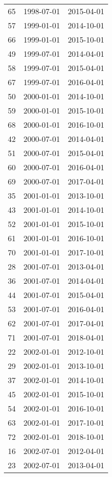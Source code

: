 % 
\begin{tabular}{ccc}
  \hline
  \hline
65 & 1998-07-01 & 2015-04-01 \\ 
  57 & 1999-01-01 & 2014-10-01 \\ 
  66 & 1999-01-01 & 2015-10-01 \\ 
  49 & 1999-07-01 & 2014-04-01 \\ 
  58 & 1999-07-01 & 2015-04-01 \\ 
  67 & 1999-07-01 & 2016-04-01 \\ 
  50 & 2000-01-01 & 2014-10-01 \\ 
  59 & 2000-01-01 & 2015-10-01 \\ 
  68 & 2000-01-01 & 2016-10-01 \\ 
  42 & 2000-07-01 & 2014-04-01 \\ 
  51 & 2000-07-01 & 2015-04-01 \\ 
  60 & 2000-07-01 & 2016-04-01 \\ 
  69 & 2000-07-01 & 2017-04-01 \\ 
  35 & 2001-01-01 & 2013-10-01 \\ 
  43 & 2001-01-01 & 2014-10-01 \\ 
  52 & 2001-01-01 & 2015-10-01 \\ 
  61 & 2001-01-01 & 2016-10-01 \\ 
  70 & 2001-01-01 & 2017-10-01 \\ 
  28 & 2001-07-01 & 2013-04-01 \\ 
  36 & 2001-07-01 & 2014-04-01 \\ 
  44 & 2001-07-01 & 2015-04-01 \\ 
  53 & 2001-07-01 & 2016-04-01 \\ 
  62 & 2001-07-01 & 2017-04-01 \\ 
  71 & 2001-07-01 & 2018-04-01 \\ 
  22 & 2002-01-01 & 2012-10-01 \\ 
  29 & 2002-01-01 & 2013-10-01 \\ 
  37 & 2002-01-01 & 2014-10-01 \\ 
  45 & 2002-01-01 & 2015-10-01 \\ 
  54 & 2002-01-01 & 2016-10-01 \\ 
  63 & 2002-01-01 & 2017-10-01 \\ 
  72 & 2002-01-01 & 2018-10-01 \\ 
  16 & 2002-07-01 & 2012-04-01 \\ 
  23 & 2002-07-01 & 2013-04-01 \\ 

\end{tabular}
